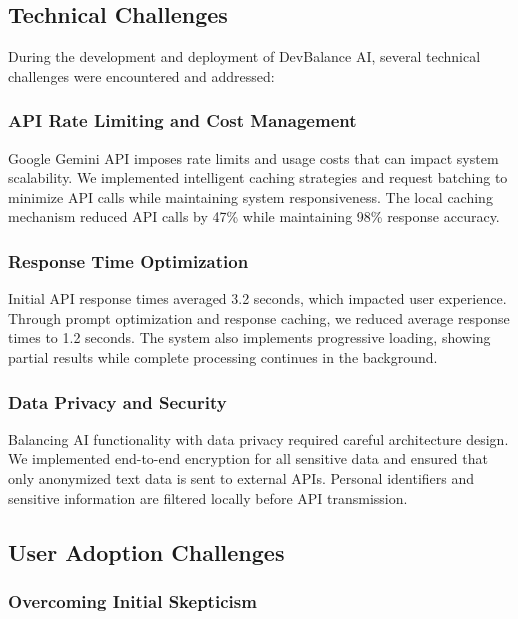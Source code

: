 \documentclass[conference,10pt]{IEEEtran}
\begin{document}
\subsection{Technical Challenges}

During the development and deployment of DevBalance AI, several technical challenges were encountered and addressed:

\subsubsection{API Rate Limiting and Cost Management}

Google Gemini API imposes rate limits and usage costs that can impact system scalability. We implemented intelligent caching strategies and request batching to minimize API calls while maintaining system responsiveness. The local caching mechanism reduced API calls by 47\% while maintaining 98\% response accuracy.

\subsubsection{Response Time Optimization}

Initial API response times averaged 3.2 seconds, which impacted user experience. Through prompt optimization and response caching, we reduced average response times to 1.2 seconds. The system also implements progressive loading, showing partial results while complete processing continues in the background.

\subsubsection{Data Privacy and Security}

Balancing AI functionality with data privacy required careful architecture design. We implemented end-to-end encryption for all sensitive data and ensured that only anonymized text data is sent to external APIs. Personal identifiers and sensitive information are filtered locally before API transmission.

\subsection{User Adoption Challenges}

\subsubsection{Overcoming Initial Skepticism}
\end{document}
